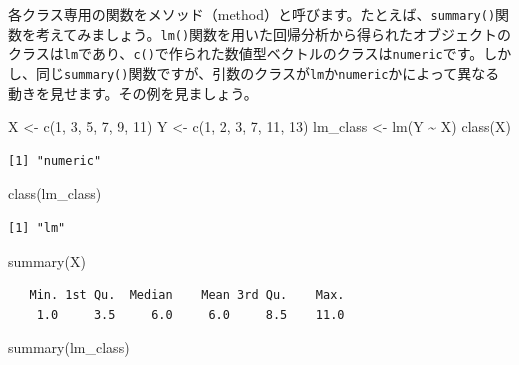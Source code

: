 \documentclass[
  a4paper,
  pandoc,
  ja=standard,
  jafont=haranoaji]{bxjsbook}
\newenvironment{Shaded}{\begin{snugshade}}{\end{snugshade}}
\newcommand{\DecValTok}[1]{\textcolor[rgb]{0.68,0.00,0.00}{#1}}
\newcommand{\FunctionTok}[1]{\textcolor[rgb]{0.28,0.35,0.67}{#1}}
\newcommand{\NormalTok}[1]{\textcolor[rgb]{0.00,0.48,0.65}{#1}}
\newcommand{\OtherTok}[1]{\textcolor[rgb]{0.00,0.48,0.65}{#1}}
\newcommand{\SpecialCharTok}[1]{\textcolor[rgb]{0.37,0.37,0.37}{#1}}
\begin{document}
各クラス専用の関数をメソッド（method）と呼びます。たとえば、\texttt{summary()}関数を考えてみましょう。\texttt{lm()}関数を用いた回帰分析から得られたオブジェクトのクラスは\texttt{lm}であり、\texttt{c()}で作られた数値型ベクトルのクラスは\texttt{numeric}です。しかし、同じ\texttt{summary()}関数ですが、引数のクラスが\texttt{lm}か\texttt{numeric}かによって異なる動きを見せます。その例を見ましょう。

\begin{Shaded}
\begin{Highlighting}[numbers=left,,]
\NormalTok{X }\OtherTok{\textless{}{-}} \FunctionTok{c}\NormalTok{(}\DecValTok{1}\NormalTok{, }\DecValTok{3}\NormalTok{, }\DecValTok{5}\NormalTok{, }\DecValTok{7}\NormalTok{, }\DecValTok{9}\NormalTok{, }\DecValTok{11}\NormalTok{)}
\NormalTok{Y }\OtherTok{\textless{}{-}} \FunctionTok{c}\NormalTok{(}\DecValTok{1}\NormalTok{, }\DecValTok{2}\NormalTok{, }\DecValTok{3}\NormalTok{, }\DecValTok{7}\NormalTok{, }\DecValTok{11}\NormalTok{, }\DecValTok{13}\NormalTok{)}
\NormalTok{lm\_class }\OtherTok{\textless{}{-}} \FunctionTok{lm}\NormalTok{(Y }\SpecialCharTok{\textasciitilde{}}\NormalTok{ X)}
\FunctionTok{class}\NormalTok{(X)}
\end{Highlighting}
\end{Shaded}

\begin{verbatim}
[1] "numeric"
\end{verbatim}

\begin{Shaded}
\begin{Highlighting}[numbers=left,,]
\FunctionTok{class}\NormalTok{(lm\_class)}
\end{Highlighting}
\end{Shaded}

\begin{verbatim}
[1] "lm"
\end{verbatim}

\begin{Shaded}
\begin{Highlighting}[numbers=left,,]
\FunctionTok{summary}\NormalTok{(X)}
\end{Highlighting}
\end{Shaded}

\begin{verbatim}
   Min. 1st Qu.  Median    Mean 3rd Qu.    Max. 
    1.0     3.5     6.0     6.0     8.5    11.0 
\end{verbatim}

\begin{Shaded}
\begin{Highlighting}[numbers=left,,]
\FunctionTok{summary}\NormalTok{(lm\_class)}
\end{Highlighting}
\end{Shaded}
\end{document}
